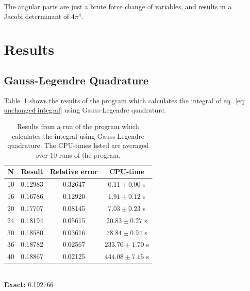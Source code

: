\documentclass[twoside, 11pt]{article}
\begin{document}
		 The angular parts are just a brute force change of variables, and results in a Jacobi determinant of $4\pi^4$.
			
			
\section{Results}
	\subsection{Gauss-Legendre Quadrature}
		Table~\ref{table: results gauss-legendre} shows the results of the program which calculates the integral of eq.~\eqref{eq: unchanged integral} using Gauss-Legendre quadrature. 
		\begin{table}[H]
			\centering
			\caption{Results from a run of the program which calculates the integral using Gauss-Legendre quadrature. The CPU-times listed are averaged over 10 runs of the program.}
			\label{table: results gauss-legendre}
			\begin{tabular}{|c|c|c|c|}
\hline
\textbf{N} 	&	\textbf{Result}	&	\textbf{Relative error}	&	\textbf{CPU-time} \\ \hline 
10 	&	0.12983	&	0.32647			&	$0.11 \pm 0.00$ s	\\ \hline
16 	&	0.16786	&	0.12920			&	$1.91 \pm 0.12$ s	\\ \hline
20 	&	0.17707	&	0.08145			&	$7.03 \pm 0.23$ s	\\ \hline
24 	&	0.18194	&	0.05615			&	$20.83 \pm 0.27$ s	\\ \hline
30 	&	0.18580	&	0.03616			&	$78.84 \pm 0.94$ s	\\ \hline
36 	&	0.18782	&	0.02567			&	$233.70 \pm 1.70$ s	\\ \hline
40 	&	0.18867	&	0.02125			&	$444.08 \pm 7.15$ s	\\ \hline			
			\end{tabular}\\
		\textbf{Exact:} 0.192766
		\end{table}
	
	
\end{document}
